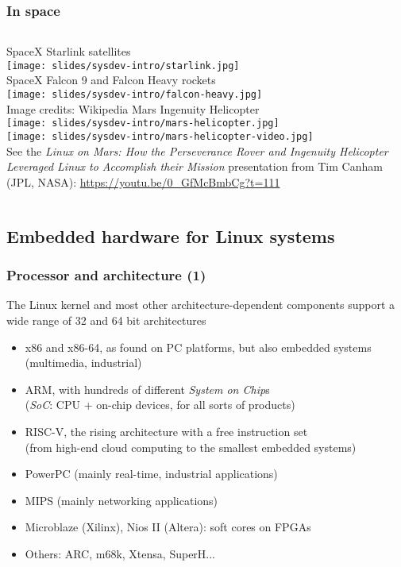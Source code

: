 \begin{frame}
\frametitle{In space}
  \begin{columns}
  \scriptsize
  SpaceX Starlink satellites\\
  \texttt{[image: slides/sysdev-intro/starlink.jpg]}\\
  SpaceX Falcon 9 and Falcon Heavy rockets\\
  \texttt{[image: slides/sysdev-intro/falcon-heavy.jpg]}\\
  \vspace{0.3cm}
  \tiny Image credits: Wikipedia
  \scriptsize
  Mars Ingenuity Helicopter\\
  \texttt{[image: slides/sysdev-intro/mars-helicopter.jpg]}\\
  \texttt{[image: slides/sysdev-intro/mars-helicopter-video.jpg]}\\
  \vspace{0.5cm}
  \tiny
  See the {\em Linux on Mars: How the Perseverance Rover and Ingenuity Helicopter Leveraged
  Linux to Accomplish their Mission} presentation from Tim Canham (JPL, NASA):
  \url{https://youtu.be/0_GfMcBmbCg?t=111}
  \end{columns}
\end{frame}

\subsection{Embedded hardware for Linux systems}

\begin{frame}
  \frametitle{Processor and architecture (1)}
  The Linux kernel and most other architecture-dependent
  components support a wide range of 32 and 64 bit architectures
  \begin{itemize}
  \item x86 and x86-64, as found on PC platforms, but also embedded systems
    (multimedia, industrial)
  \item ARM, with hundreds of different {\em System on Chip}s\\
        ({\em SoC}: CPU + on-chip devices, for all sorts of products)
  \item RISC-V, the rising architecture with a free instruction set\\
        (from high-end cloud computing to the smallest embedded systems)
  \item PowerPC (mainly real-time, industrial applications)
  \item MIPS (mainly networking applications)
  \item Microblaze (Xilinx), Nios II (Altera): soft cores on FPGAs
  \item Others: ARC, m68k, Xtensa, SuperH...
  \end{itemize}
\end{frame}

